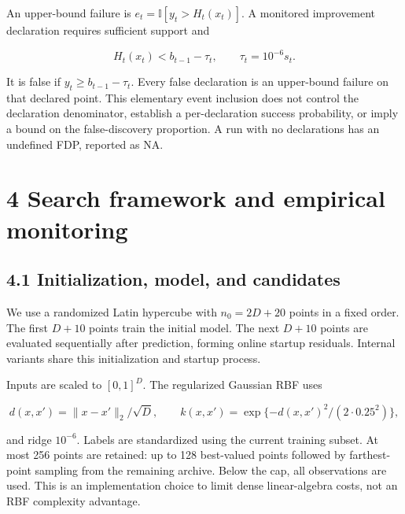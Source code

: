 \documentclass[11pt,a4paper]{article}
\begin{document}
\par\noindent\begin{minipage}{\linewidth}

An upper-bound failure is \(e_t=\mathbb I[y_t>H_t(x_t)]\). A monitored
improvement declaration requires sufficient support and

\[H_t(x_t)<b_{t-1}-\tau_t,\qquad\tau_t=10^{-6}s_t.\]

\end{minipage}\par

It is false if \(y_t\ge b_{t-1}-\tau_t\). Every false declaration is an
upper-bound failure on that declared point. This elementary event
inclusion does not control the declaration denominator, establish a
per-declaration success probability, or imply a bound on the
false-discovery proportion. A run with no declarations has an undefined
FDP, reported as NA.

\hypertarget{search-framework-and-empirical-monitoring}{%
\section{4 Search framework and empirical
monitoring}\label{search-framework-and-empirical-monitoring}}

\hypertarget{initialization-model-and-candidates}{%
\subsection{4.1 Initialization, model, and
candidates}\label{initialization-model-and-candidates}}

We use a randomized Latin hypercube with \(n_0=2D+20\) points in a fixed
order. The first \(D+10\) points train the initial model. The next
\(D+10\) points are evaluated sequentially after prediction, forming
online startup residuals. Internal variants share this initialization
and startup process.

\par\noindent\begin{minipage}{\linewidth}

Inputs are scaled to \([0,1]^D\). The regularized Gaussian RBF uses

\[d(x,x')=\|x-x'\|_2/\sqrt D,\qquad k(x,x')=\exp\{-d(x,x')^2/(2\cdot0.25^2)\},\]

\end{minipage}\par

and ridge \(10^{-6}\). Labels are standardized using the current
training subset. At most 256 points are retained: up to 128 best-valued
points followed by farthest-point sampling from the remaining archive.
Below the cap, all observations are used. This is an implementation
choice to limit dense linear-algebra costs, not an RBF complexity
advantage.
\end{document}
